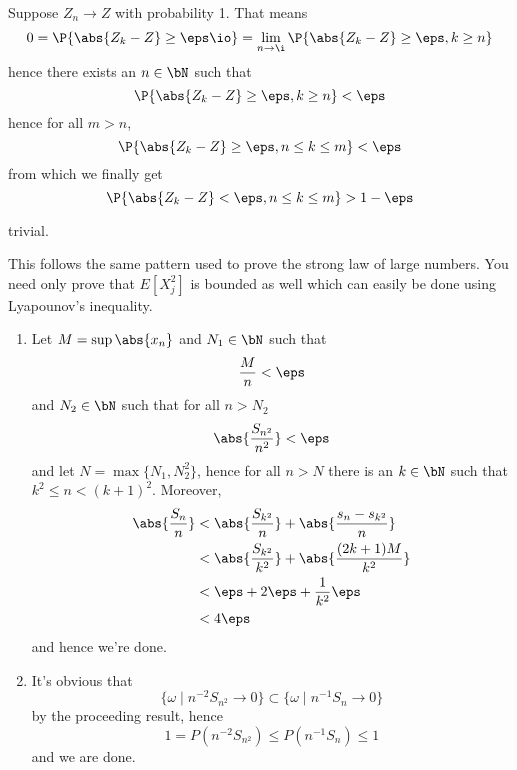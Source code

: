 \documentclass{pset}
\begin{document}
\maketitle

\pagebreak
\begin{problem}
    Suppose $Z_n \to Z$ with probability 1. That means
    \[0 = \P{\abs{Z_k-Z}\geq \eps \io} = \lim_{n\to\i} \P{\abs{Z_k-Z}\geq \eps, k\geq n}\]
    hence there exists an $n\in\bN$ such that
    \[\P{\abs{Z_k-Z}\geq \eps, k\geq n}< \eps\]
    hence for all $m>n$,
    \[\P{\abs{Z_k-Z}\geq \eps, n\leq k\leq m}< \eps\]
    from which we finally get
    \[\P{\abs{Z_k-Z}<  \eps, n\leq k\leq m}>1-\eps\]
\end{problem}
\setcounter{problemCounter}{4}
\begin{problem}
    trivial.
\end{problem}
\setcounter{problemCounter}{6}
\begin{problem}
    This follows the same pattern used to prove the strong law of large numbers. You need only prove that $E[X_j^2]$ is bounded as well which can easily be done using Lyapounov's inequality.
\end{problem}
\begin{problem}
    \begin{enumerate}[label=(\alph*)]
        \item Let $M=\sup \abs{x_n}$ and $N_1\in\bN$ such that
        \[\frac{M}{n} < \eps\]
        and $N_2\in\bN$ such that for all $n>N_2$
        \[\abs{\frac{S_{n^2}}{n^2}}<\eps\]
        and let $N=\max\{N_1, N_2^2\}$, hence for all $n>N$ there is an $k\in\bN$ such that $k^2\leq n<(k+1)^2$. Moreover,
        \begin{align*}
            \abs{\frac{S_n}{n}} &< \abs{\frac{S_{k^2}}{n}}+\abs{\frac{s_n-s_{k^2}}{n}} \\
            &< \abs{\frac{S_{k^2}}{k^2}}+\abs{\frac{(2k+1)M}{k^2}} \\
            &< \eps + 2\eps+\frac{1}{k^2}\eps \\
            &< 4\eps
        \end{align*}
        and hence we're done.
        \item It's obvious that
        \[\{\omega\mid n^{-2}S_{n^2} \to 0\}\subset \{\omega\mid n^{-1}S_{n} \to 0\}\]
        by the proceeding result, hence
        \[1=P(n^{-2}S_{n^2})\leq P(n^{-1}S_{n}) \leq 1\]
        and we are done.
    \end{enumerate}
\end{problem}
\end{document}
